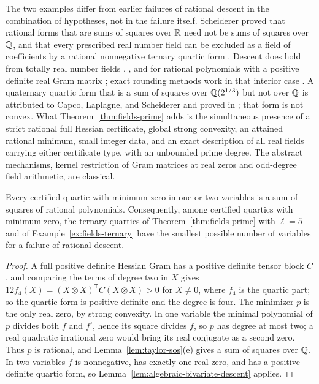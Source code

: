 The two examples differ from earlier failures of rational descent in the
combination of hypotheses, not in the failure itself. Scheiderer proved
that rational forms that are sums of squares over $\mathbb R$ need not be sums of
squares over $\mathbb Q$, and that every prescribed real number field can be
excluded as a field of coefficients by a rational nonnegative ternary quartic
form \cite[Theorem~2.1 and Corollary~2.11]{Scheiderer2016}. Descent does
hold from totally real number fields \cite[Theorem~1.4]{Hillar2009},
\cite[Theorem~1.2]{Scheiderer2016}, and for rational polynomials with a
positive definite real Gram matrix \cite[Theorem~1.2]{Hillar2009}; exact
rounding methods work in that interior case
\cite{PeyrlParrilo2008,DavisPapp2022}. A quaternary
quartic form that is a sum of squares over $\mathbb Q(2^{1/3})$ but not over $\mathbb Q$ is
attributed to Capco, Laplagne, and Scheiderer and proved in
\cite[Section~3.1]{Laplagne2024}; that form is not convex. What
Theorem~\ref{thm:fields-prime} adds is the simultaneous presence of a strict
rational full Hessian certificate, global strong convexity, an attained
rational minimum, small integer data, and an exact description of all real
fields carrying either certificate type, with an unbounded prime degree. The
abstract mechanisms, kernel restriction of Gram matrices at real zeros and
odd-degree field arithmetic, are classical.

\begin{corollary}
\label{cor:fields-dimension}
Every certified quartic with minimum zero in one or two variables is a sum of
squares of rational polynomials. Consequently, among certified quartics with
minimum zero, the ternary quartics of Theorem~\ref{thm:fields-prime} with
$\ell=5$ and of Example~\ref{ex:fields-ternary} have the smallest possible
number of variables for a failure of rational descent.
\end{corollary}

\begin{proof}
A full positive definite Hessian Gram has a positive definite tensor block
$C$, and comparing the terms of degree two in $X$ gives
$12f_4(X)=(X\otimes X)^{\mathsf T}C(X\otimes X)>0$ for $X\ne0$, where $f_4$
is the quartic part; so the quartic form is positive definite and the degree
is four. The minimizer $p$ is the only real zero, by strong convexity. In one
variable the minimal polynomial of $p$ divides both $f$ and $f'$, hence its
square divides $f$, so $p$ has degree at most two; a real quadratic
irrational zero would bring its real conjugate as a second zero. Thus $p$ is
rational, and Lemma~\ref{lem:taylor-sos}(e) gives a sum of squares over
$\mathbb Q$. In two variables $f$ is nonnegative, has exactly one real zero, and
has a positive definite quartic form, so
Lemma~\ref{lem:algebraic-bivariate-descent} applies.
\end{proof}

